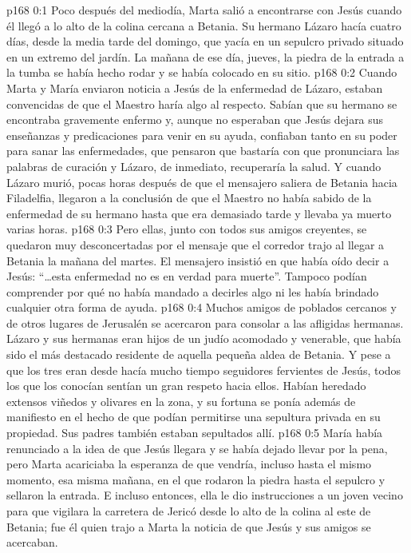 \author{Comisión de seres intermedios}
\vs p168 0:1 Poco después del mediodía, Marta salió a encontrarse con Jesús cuando él llegó a lo alto de la colina cercana a Betania. Su hermano Lázaro hacía cuatro días, desde la media tarde del domingo, que yacía en un sepulcro privado situado en un extremo del jardín. La mañana de ese día, jueves, la piedra de la entrada a la tumba se había hecho rodar y se había colocado en su sitio.
\vs p168 0:2 Cuando Marta y María enviaron noticia a Jesús de la enfermedad de Lázaro, estaban convencidas de que el Maestro haría algo al respecto. Sabían que su hermano se encontraba gravemente enfermo y, aunque no esperaban que Jesús dejara sus enseñanzas y predicaciones para venir en su ayuda, confiaban tanto en su poder para sanar las enfermedades, que pensaron que bastaría con que pronunciara las palabras de curación y Lázaro, de inmediato, recuperaría la salud. Y cuando Lázaro murió, pocas horas después de que el mensajero saliera de Betania hacia Filadelfia, llegaron a la conclusión de que el Maestro no había sabido de la enfermedad de su hermano hasta que era demasiado tarde y llevaba ya muerto varias horas.
\vs p168 0:3 Pero ellas, junto con todos sus amigos creyentes, se quedaron muy desconcertadas por el mensaje que el corredor trajo al llegar a Betania la mañana del martes. El mensajero insistió en que había oído decir a Jesús: “\ldots esta enfermedad no es en verdad para muerte”. Tampoco podían comprender por qué no había mandado a decirles algo ni les había brindado cualquier otra forma de ayuda.
\vs p168 0:4 Muchos amigos de poblados cercanos y de otros lugares de Jerusalén se acercaron para consolar a las afligidas hermanas. Lázaro y sus hermanas eran hijos de un judío acomodado y venerable, que había sido el más destacado residente de aquella pequeña aldea de Betania. Y pese a que los tres eran desde hacía mucho tiempo seguidores fervientes de Jesús, todos los que los conocían sentían un gran respeto hacia ellos. Habían heredado extensos viñedos y olivares en la zona, y su fortuna se ponía además de manifiesto en el hecho de que podían permitirse una sepultura privada en su propiedad. Sus padres también estaban sepultados allí.
\vs p168 0:5 María había renunciado a la idea de que Jesús llegara y se había dejado llevar por la pena, pero Marta acariciaba la esperanza de que vendría, incluso hasta el mismo momento, esa misma mañana, en el que rodaron la piedra hasta el sepulcro y sellaron la entrada. E incluso entonces, ella le dio instrucciones a un joven vecino para que vigilara la carretera de Jericó desde lo alto de la colina al este de Betania; fue él quien trajo a Marta la noticia de que Jesús y sus amigos se acercaban.
